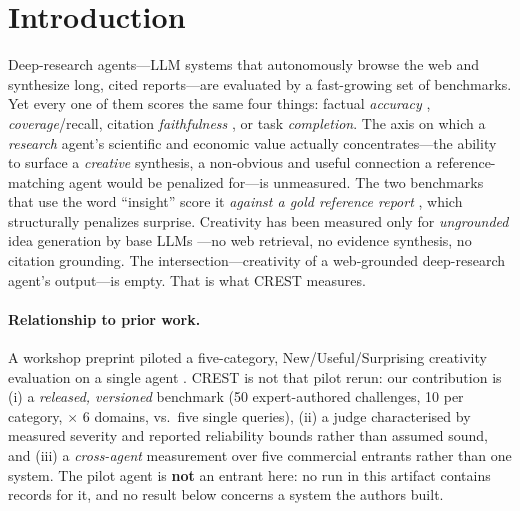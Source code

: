 \section{Introduction}

Deep-research agents---LLM systems that autonomously browse the web and synthesize long, cited reports---are evaluated by a fast-growing set of benchmarks. Yet every one of them scores the same four things: factual \emph{accuracy} \citep{mialon2023gaia,wei2025browsecomp}, \emph{coverage}/recall, citation \emph{faithfulness} \citep{du2025deepresearchbench}, or task \emph{completion}. The axis on which a \emph{research} agent's scientific and economic value actually concentrates---the ability to surface a \emph{creative} synthesis, a non-obvious and useful connection a reference-matching agent would be penalized for---is unmeasured. The two benchmarks that use the word ``insight'' score it \emph{against a gold reference report} \citep{du2025deepresearchbench,researcherbench2025}, which structurally penalizes surprise. Creativity has been measured only for \emph{ungrounded} idea generation by base LLMs \citep{si2024novel,ruan2024liveideabench}---no web retrieval, no evidence synthesis, no citation grounding. The intersection---creativity of a web-grounded deep-research agent's output---is empty. That is what \textsc{CREST} measures.

\paragraph{Relationship to prior work.} A workshop preprint piloted a five-category, New/Useful/Surprising creativity evaluation on a single agent \citep{caesar2026}. CREST is not that pilot rerun: our contribution is (i) a \emph{released, versioned} benchmark (50 expert-authored challenges, 10 per category, $\times$ 6 domains, vs.\ five single queries), (ii) a judge characterised by measured severity and reported reliability bounds rather than assumed sound, and (iii) a \emph{cross-agent} measurement over five commercial entrants rather than one system. The pilot agent is \textbf{not} an entrant here: no run in this artifact contains records for it, and no result below concerns a system the authors built.


